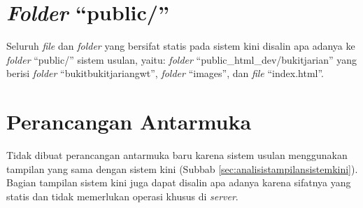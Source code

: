 \section{\textit{Folder} ``public/''}
\label{sec:perancanganfolderpublic}
Seluruh \textit{file} dan \textit{folder} yang bersifat statis pada sistem kini disalin apa adanya ke \textit{folder} ``public/'' sistem usulan, yaitu: \textit{folder} ``public\_html\_dev/bukitjarian'' yang berisi \textit{folder} ``bukitbukitjariangwt'', \textit{folder} ``images'', dan \textit{file} ``index.html''.

\section{Perancangan Antarmuka}
\label{sec:perancanganantarmuka}
Tidak dibuat perancangan antarmuka baru karena sistem usulan menggunakan tampilan yang sama dengan sistem kini (Subbab \ref{sec:analisistampilansistemkini}). Bagian tampilan sistem kini juga dapat disalin apa adanya karena sifatnya yang statis dan tidak memerlukan operasi khusus di \textit{server}.